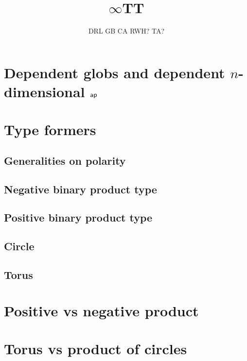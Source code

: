 \documentclass[11pt]{article}
\begin{document}
\title{$\infty$TT}
\author{DRL \qquad GB \qquad CA \qquad RWH? \qquad TA?}
\maketitle



\clearpage
\section{Dependent globs and dependent $n$-dimensional $\mathsf{ap}$}


\clearpage
\section{Type formers}

\subsection{Generalities on polarity}


\subsection{Negative binary product type}


\subsection{Positive binary product type}


\subsection{Circle}


\subsection{Torus}


\clearpage
\section{Positive vs negative product}


\clearpage
\section{Torus vs product of circles}

\end{document}
